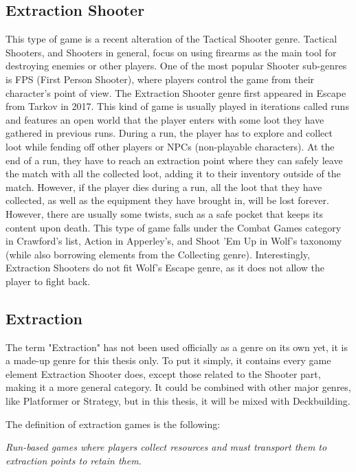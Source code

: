 \subsection{Extraction Shooter}

This type of game is a recent alteration of the Tactical Shooter genre. Tactical Shooters, and Shooters in general, focus on using firearms as the main tool for destroying enemies or other players. One of the most popular Shooter sub-genres is FPS (First Person Shooter), where players control the game from their character's point of view. The Extraction Shooter genre first appeared in Escape from Tarkov\cite{escapeFromTarkov2017} in 2017. This kind of game is usually played in iterations called runs and features an open world that the player enters with some loot they have gathered in previous runs. During a run, the player has to explore and collect loot while fending off other players or NPCs (non-playable characters). At the end of a run, they have to reach an extraction point where they can safely leave the match with all the collected loot, adding it to their inventory outside of the match. However, if the player dies during a run, all the loot that they have collected, as well as the equipment they have brought in, will be lost forever. However, there are usually some twists, such as a safe pocket that keeps its content upon death. This type of game falls under the Combat Games category in Crawford's list\cite{crawford1984art}, Action in Apperley's, and Shoot 'Em Up in Wolf's taxonomy (while also borrowing elements from the Collecting genre). Interestingly, Extraction Shooters do not fit Wolf's Escape genre, as it does not allow the player to fight back.



\subsection{Extraction}

The term "Extraction" has not been used officially as a genre on its own yet, it is a made-up genre for this thesis only. To put it simply, it contains every game element Extraction Shooter does, except those related to the Shooter part, making it a more general category. It could be combined with other major genres, like Platformer or Strategy, but in this thesis, it will be mixed with Deckbuilding. 

The definition of extraction games is the following: 

\textit{Run-based games where players collect resources and must transport them to extraction points to retain them.}

